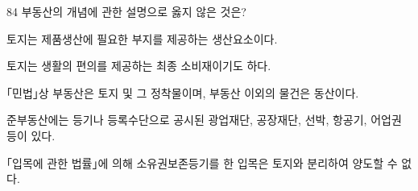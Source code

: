 \begin{question}{84}
부동산의 개념에 관한 설명으로 옳지 않은 것은?
\begin{choices}
  \item 토지는 제품생산에 필요한 부지를 제공하는 생산요소이다.
  \item 토지는 생활의 편의를 제공하는 최종 소비재이기도 하다.
  \item ｢민법｣상 부동산은 토지 및 그 정착물이며, 부동산 이외의 물건은 동산이다.
  \item 준부동산에는 등기나 등록수단으로 공시된 광업재단, 공장재단, 선박, 항공기, 어업권 등이 있다.
  \item ｢입목에 관한 법률｣에 의해 소유권보존등기를 한 입목은 토지와 분리하여 양도할 수 없다.
\end{choices}
\end{question}
